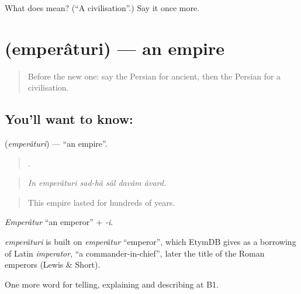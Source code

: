 \begin{tcolorbox}[breakable,colback=teal!4,colframe=teal!35!black,title={Before you move on}]
What does  mean? (\textquotedblleft{}A civilisation\textquotedblright{}.) Say it once more.
\end{tcolorbox}
\section[\texorpdfstring{\fa{امپراتوری} (emperâturi)}{امپراتوری (emperâturi)}]{ (emperâturi) — an empire}

\label{lesson:FA-C352-emperaturi}



\begin{quote}
Before the new one: say the Persian for ancient, then the Persian for a civilisation.
\end{quote}

\subsection*{You'll want to know: }
\textbf{} (\emph{emperâturi}) — \textquotedblleft{}an empire\textquotedblright{}.

\begin{quote}
     .
\end{quote}

\begin{quote}
\emph{In emperâturi sad-hâ sâl davâm âvard.}
\end{quote}

\begin{quote}
This empire lasted for hundreds of years.
\end{quote}

\emph{Emperâtur} \textquotedblleft{}an emperor\textquotedblright{} + \emph{-i}.

\begin{cousinweb}
\emph{emperâturi} is built on \emph{emperâtur} \textquotedblleft{}emperor\textquotedblright{}, which EtymDB gives as a borrowing of Latin \emph{imperator}, \textquotedblleft{}a commander-in-chief\textquotedblright{}, later the title of the Roman emperors (Lewis \& Short).
\end{cousinweb}

\begin{grammarlens}[title={What you've built}]
One more word for telling, explaining and describing at B1.
\end{grammarlens}

